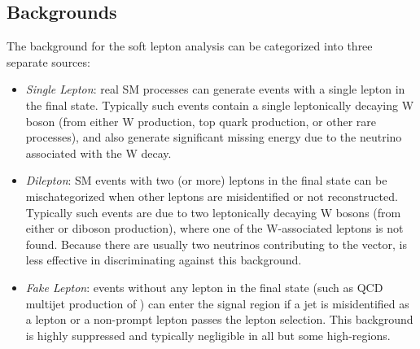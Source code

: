\subsection{Backgrounds}
\label{subsec:softbkgs}
The background for the soft lepton analysis can be categorized into three separate sources:
\begin{itemize}
	\item {\it Single Lepton}: real SM processes can generate events with a single lepton in the final state. Typically such events contain a single leptonically decaying W boson (from either W production, top quark production, or other rare processes), and also generate significant missing energy due to the neutrino associated with the W decay.
	\item {\it Dilepton}: SM events with two (or more) leptons in the final state can be mischategorized when other leptons are misidentified or not reconstructed. Typically such events are due to two leptonically decaying W bosons (from either \ttbar or diboson production), where one of the W-associated leptons is not found. Because there are usually two neutrinos contributing to the \MET vector, \mt is less effective in discriminating against this background.
	\item {\it Fake Lepton}: events without any lepton in the final state (such as QCD multijet production of \znunu) can enter the signal region if a jet is misidentified as a lepton or a non-prompt lepton passes the lepton selection. This background is highly suppressed and typically negligible in all but some high-\mt regions.
\end{itemize}

